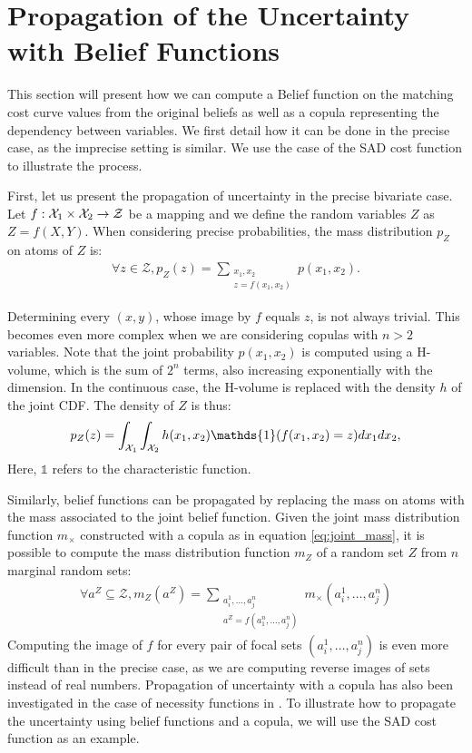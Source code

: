 \section{Propagation of the Uncertainty with Belief Functions}
This section will present how we can compute a Belief function on the matching cost curve values from the original beliefs as well as a copula representing the dependency between variables. We first detail how it can be done in the precise case, as the imprecise setting is similar. We use the case of the SAD cost function to illustrate the process.

First, let us present the propagation of uncertainty in the precise bivariate case. Let $f:{\mathcal{X}}_1\times{\mathcal{X}}_2\rightarrow\mathcal{Z}$ be a mapping and we define the random variables $Z$ as $Z=f(X,Y)$. 
When considering precise probabilities, the mass distribution $p_Z$ on atoms of $Z$ is:
\begin{align}
    \forall z\in\mathcal{Z}, p_Z(z)=\sum_{\substack{x_1,x_2\\z=f(x_1,x_2)}}p(x_1,x_2).
\end{align}

Determining every $(x,y)$, whose image by $f$ equals $z$, is not always trivial. This becomes even more complex when we are considering copulas with $n>2$ variables. Note that the joint probability $p(x_1,x_2)$ is computed using a H-volume, which is the sum of $2^n$ terms, also increasing exponentially with the dimension. In the continuous case, the H-volume is replaced with the density $h$ of the joint CDF. The density of $Z$ is thus:
\begin{align}
    p_Z(z) = \int_{\X_1}\int_{\X_2}h(x_1,x_2)\mathds{1}(f(x_1,x_2)=z)dx_1dx_2,
\end{align}
Here, $\mathds{1}$ refers to the characteristic function.

Similarly, belief functions can be propagated by replacing the mass on atoms with the mass associated to the joint belief function. Given the joint mass distribution function $m_\times$ constructed with a copula as in equation \eqref{eq:joint_mass}, it is possible to compute the mass distribution function $m_Z$ of a random set $Z$ from $n$ marginal random sets:
\begin{align}
    \forall a^Z\subseteq\mathcal{Z}, m_Z(a^Z) = \sum_{\substack{a^1_i, \dots, a^n_j\\a^Z=f(a^n_1,\dots, a^n_j)}}m_\times(a^1_i, \dots, a^n_j)\label{eq:mass_propagated}
\end{align}
Computing the image of $f$ for every pair of focal sets $(a^1_i, \dots, a^n_j)$ is even more difficult than in the precise case, as we are computing reverse images of sets instead of real numbers. Propagation of uncertainty with a copula has also been investigated in the case of necessity functions in \cite{gray_dependent_2021}. To illustrate how to propagate the uncertainty using belief functions and a copula, we will use the SAD cost function as an example.

